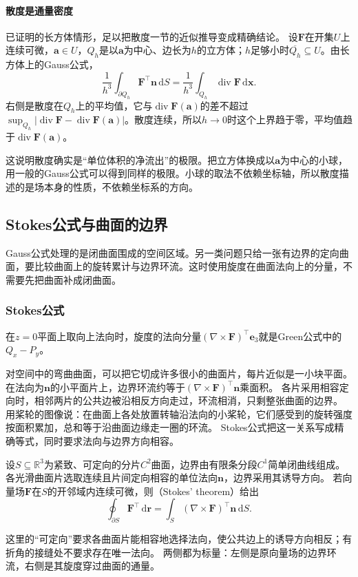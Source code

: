 \paragraph{散度是通量密度}

已证明的长方体情形，足以把散度一节的近似推导变成精确结论。
设$\bm F$在开集$U$上连续可微，$\bm a\in U$，$Q_h$是以$\bm a$为中心、边长为$h$的立方体；$h$足够小时$\overline{Q_h}\subseteq U$。由长方体上的Gauss公式，
\[
 \frac1{h^3}\int_{\partial Q_h}\bm F^\top\bm n\,\mathrm dS
 =\frac1{h^3}\int_{Q_h}\operatorname{div}\bm F\,\mathrm d\bm x.
\]
右侧是散度在$Q_h$上的平均值，它与$\operatorname{div}\bm F(\bm a)$的差不超过$\sup_{Q_h}|\operatorname{div}\bm F-\operatorname{div}\bm F(\bm a)|$。散度连续，所以$h\to0$时这个上界趋于零，平均值趋于$\operatorname{div}\bm F(\bm a)$。

这说明散度确实是“单位体积的净流出”的极限。把立方体换成以$\bm a$为中心的小球，用一般的Gauss公式可以得到同样的极限。小球的取法不依赖坐标轴，所以散度描述的是场本身的性质，不依赖坐标系的方向。

\subsection{Stokes公式与曲面的边界}

Gauss公式处理的是闭曲面围成的空间区域。另一类问题只给一张有边界的定向曲面，要比较曲面上的旋转累计与边界环流。这时使用旋度在曲面法向上的分量，不需要先把曲面补成闭曲面。

\subsubsection{Stokes公式}

在$z=0$平面上取向上法向时，旋度的法向分量$(\nabla\times\bm F)^\top\bm e_3$就是Green公式中的$Q_x-P_y$。

对空间中的弯曲曲面，可以把它切成许多很小的曲面片，每片近似是一小块平面。在法向为$\bm n$的小平面片上，边界环流约等于$(\nabla\times\bm F)^\top\bm n$乘面积。
各片采用相容定向时，相邻两片的公共边被沿相反方向走过，环流相消，只剩整张曲面的边界。
用桨轮的图像说：在曲面上各处放置转轴沿法向的小桨轮，它们感受到的旋转强度按面积累加，总和等于沿曲面边缘走一圈的环流。
Stokes公式把这一关系写成精确等式，同时要求法向与边界方向相容。
\begin{theorem}[Stokes定理]
\label{thm:multivariable-stokes}
设$S\subseteq\mathbb R^3$为紧致、可定向的分片$C^2$曲面，边界由有限条分段$C^1$简单闭曲线组成。
各光滑曲面片选取连续且片间定向相容的单位法向$\bm n$，边界采用其诱导方向。
若向量场$\bm F$在$S$的开邻域内连续可微，则（Stokes' theorem）给出
\begin{equation}
 \oint_{\partial S}\bm F^\top\,\mathrm d\bm r
 =\int_S(\nabla\times\bm F)^\top\bm n\,\mathrm dS.
 \label{eq:multivariable-stokes}
\end{equation}
\end{theorem}
这里的“可定向”要求各曲面片能相容地选择法向，使公共边上的诱导方向相反；有折角的接缝处不要求存在唯一法向。
两侧都为标量：左侧是原向量场的边界环流，右侧是其旋度穿过曲面的通量。

